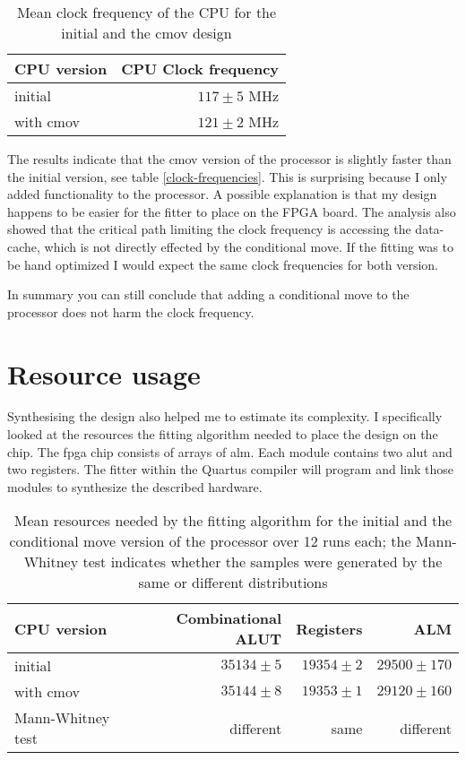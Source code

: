 \documentclass[12pt,twoside,notitlepage]{report}
\begin{document}
\begin{table}
\center
\begin{tabular}{l | r  }
	CPU version & CPU Clock frequency \\

\hline

	initial & $117 \pm 5$ MHz  \\
	with cmov & $121 \pm 2$ MHz \\
\end{tabular}
\caption{Mean clock frequency of the CPU for the initial and the cmov design}
\end{table}

The results indicate that the cmov version of the processor is slightly faster than the initial version, see table \ref{clock-frequencies}. This is surprising because I only added functionality to the processor. A possible explanation is that my design happens to be easier for the fitter to place on the FPGA board. The analysis also showed that the critical path limiting the clock frequency is accessing the data-cache, which is not directly effected by the conditional move. If the fitting was to be hand optimized I would expect the same clock frequencies for both version.

In summary you can still conclude that adding a conditional move to the processor does not harm the clock frequency.

\section{Resource usage}

Synthesising the design also helped me to estimate its complexity. I specifically looked at the resources the fitting algorithm needed to place the design on the chip. The \gls{fpga} chip consists of arrays of \gls{alm}. Each module contains two \gls{alut} and two registers. The fitter within the Quartus compiler will program and link those modules to synthesize the described hardware.

\begin{table}
\center
\begin{tabular}{l | r | r | r }
	CPU version & Combinational ALUT & Registers & ALM \\

\hline

	initial & $35134 \pm 5$ & $19354 \pm 2$ & $29500 \pm 170$ \\
	with cmov & $35144 \pm 8$& $19353 \pm 1$ & $ 29120 \pm 160$ \\
	
\hhline{=|=|=|=}
	Mann-Whitney test & different & same & different \\
\end{tabular}
\caption{Mean resources needed by the fitting algorithm for the initial and the conditional move version of the processor over 12 runs each; the Mann-Whitney test indicates whether the samples were generated by the same or different distributions}
\end{table}
\end{document}
